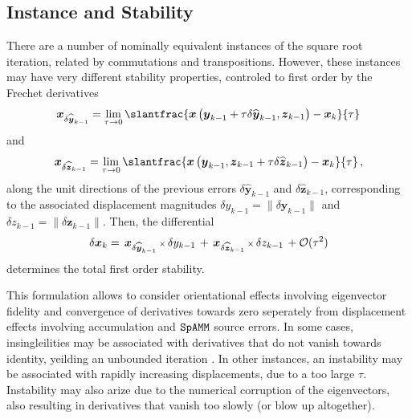 \documentclass[letterpaper,twocolumn,amsmath,amsfont,amssymb,english,aps,jcp,preprintnumbers,groupaddress,nofootinbib,tightenlines,floatfix]{revtex4}
\newcommand{\mat}[1]{\boldsymbol{#1}}
\theoremstyle{plain}
\theoremstyle{remark}
\theoremstyle{plain}
\begin{document}
\subsection{Instance and Stability}

There are a number of nominally equivalent instances of the square root iteration, related by commutations and transpositions. 
However, these instances may have very different stability properties,  controled to first order by the Frechet derivatives
\begin{equation}
  \mat{x}_{\delta \widehat{ \mat{y}}_{k-1}}
= \lim_{\tau \rightarrow 0} \slantfrac{ \mat{x} \left( \mat{y}_{k-1} + \tau \delta \widehat{\mat{y}}_{k-1} ,  {\mat{z}}_{k-1}  \right)
                                     -\mat{x}_k    }{\tau} 
 \end{equation}
and
 \begin{equation}
 \mat{x}_{\delta \widehat{ \mat{z}}_{k-1}} = \lim_{\tau \rightarrow 0}
\slantfrac{ \mat{x} \left( {\mat{y}}_{k-1} , \mat{z}_{k-1} +\tau  \delta \widehat{\mat{z}}_{k-1} \right) - \mat{x}_k   }{\tau}  \, , 
 \end{equation}
along the unit directions of the previous errors $\delta \widehat{\mat{y}}_{k-1}$ and $\delta \widehat{\mat{z}}_{k-1}$, corresponding 
to the associated displacement magnitudes $\delta y_{k-1} = \lVert \delta \mat{y}_{k-1} \rVert$  and  $\delta z_{k-1}=\lVert \delta \mat{z}_{k-1} \rVert$.
Then, the differential 
\begin{equation} \label{firstorderdual}
\delta \mat{x}_k = \,  { \mat{x}}_{\delta \widehat{\mat{y}}_{k-1}}  \, {\scriptstyle \times} \, \delta y_{k-1}
                 \, + \,  { \mat{x}}_{\delta \widehat{\mat{z}}_{k-1}}  \, {\scriptstyle \times} \, \delta z_{k-1}  \, + {\cal O}(\tau^2) 
\end{equation}
determines the total first order stability. 

This formulation allows to consider orientational effects involving eigenvector fidelity and convergence of 
derivatives towards zero seperately from displacement effects involving accumulation and $\tt SpAMM$ source errors.
In some cases, insingleilities may be associated with derivatives that do not vanish towards identity, yeilding an unbounded iteration \cite{}.
In other instances, an instability may be associated with rapidly increasing displacements, due to a too large $\tau$.  Instability 
may also arize due to the numerical corruption of the eigenvectors, also resulting in derivatives that vanish too slowly (or blow up altogether).    
\end{document}
